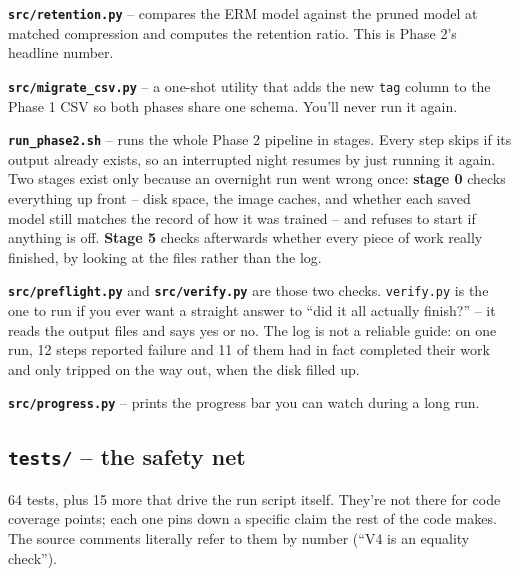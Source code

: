 \documentclass[11pt]{article}
\newcommand{\f}[1]{\textcolor{accent}{\texttt{#1}}}
\newcommand{\code}[1]{\texttt{\small #1}}
\begin{document}
\textbf{\f{src/retention.py}} -- compares the ERM model against the pruned model
at matched compression and computes the retention ratio. This is Phase 2's
headline number.

\textbf{\f{src/migrate\_csv.py}} -- a one-shot utility that adds the new
\code{tag} column to the Phase 1 CSV so both phases share one schema. You'll
never run it again.

\textbf{\f{run\_phase2.sh}} -- runs the whole Phase 2 pipeline in stages. Every
step skips if its output already exists, so an interrupted night resumes by just
running it again. Two stages exist only because an overnight run went wrong
once: \textbf{stage 0} checks everything up front -- disk space, the image
caches, and whether each saved model still matches the record of how it was
trained -- and refuses to start if anything is off. \textbf{Stage 5} checks
afterwards whether every piece of work really finished, by looking at the files
rather than the log.

\textbf{\f{src/preflight.py}} and \textbf{\f{src/verify.py}} are those two
checks. \f{verify.py} is the one to run if you ever want a straight answer to
``did it all actually finish?'' -- it reads the output files and says yes or no.
The log is not a reliable guide: on one run, 12 steps reported failure and 11 of
them had in fact completed their work and only tripped on the way out, when the
disk filled up.

\textbf{\f{src/progress.py}} -- prints the progress bar you can watch during a
long run.

\subsection{\texttt{tests/} -- the safety net}

64 tests, plus 15 more that drive the run script itself. They're not there for
code coverage points; each one pins down a
specific claim the rest of the code makes. The source comments literally refer
to them by number (``V4 is an equality check'').
\end{document}
